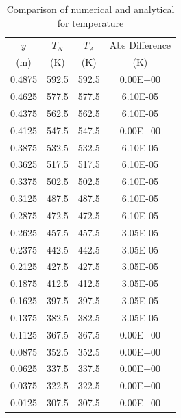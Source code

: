 \begin{table}[h]
    \centering
    \caption{Comparison of numerical and analytical for temperature}
    \begin{tabular}{cccc}
        \toprule
        $y$ & $T_N$ & $T_A$ & Abs Difference \\
        (m) & (K) & (K) & (K) \\
        \midrule
        0.4875	& 592.5	& 592.5	& 0.00E+00 \\
        0.4625	& 577.5	& 577.5	& 6.10E-05 \\
        0.4375	& 562.5	& 562.5	& 6.10E-05 \\
        0.4125	& 547.5	& 547.5	& 0.00E+00 \\
        0.3875	& 532.5	& 532.5	& 6.10E-05 \\
        0.3625	& 517.5	& 517.5	& 6.10E-05 \\
        0.3375	& 502.5	& 502.5	& 6.10E-05 \\
        0.3125	& 487.5	& 487.5	& 6.10E-05 \\
        0.2875	& 472.5	& 472.5	& 6.10E-05 \\
        0.2625	& 457.5	& 457.5	& 3.05E-05 \\
        0.2375	& 442.5	& 442.5	& 3.05E-05 \\
        0.2125	& 427.5	& 427.5	& 3.05E-05 \\
        0.1875	& 412.5	& 412.5	& 3.05E-05 \\
        0.1625	& 397.5	& 397.5	& 3.05E-05 \\
        0.1375	& 382.5	& 382.5	& 3.05E-05 \\
        0.1125	& 367.5	& 367.5	& 0.00E+00 \\
        0.0875	& 352.5	& 352.5	& 0.00E+00 \\
        0.0625	& 337.5	& 337.5	& 0.00E+00 \\
        0.0375	& 322.5	& 322.5	& 0.00E+00 \\
        0.0125	& 307.5	& 307.5	& 0.00E+00 \\
        \bottomrule
    \end{tabular}
    \label{tab:Q6temperature}
\end{table}         

